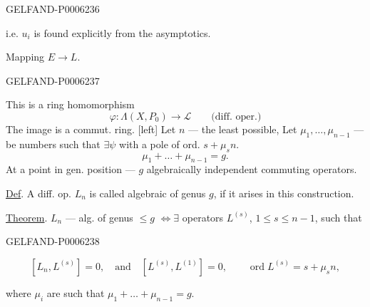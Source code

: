 \begin{GelfandAdjacentEvidence}{GELFAND-P000623}{6}

i.e. \(u_i\) is found explicitly from the asymptotics.

Mapping \(E\longrightarrow L\).
\end{GelfandAdjacentEvidence}
\begin{GelfandAdjacentEvidence}{GELFAND-P000623}{7}

This is a ring homomorphism
\[
\varphi:\Lambda(X,P_0)\longrightarrow\mathcal L\qquad\text{(diff. oper.)}
\]
The image is a commut. ring.
[left] Let \(n\) — the least possible,
Let \(\mu_1,\ldots,\mu_{n-1}\) — be numbers such that
\(\exists\psi\) with a pole of ord. \(s+\mu_s n\).
\[
\mu_1+\ldots+\mu_{n-1}=g.
\]
At a point in gen. position — \(g\) algebraically independent commuting operators.

\underline{Def}. A diff. op. \(L_n\) is called algebraic of genus \(g\), if it arises in this construction.

\underline{Theorem}. \(L_n\) — alg. of genus \(\le g\)
\(\Longleftrightarrow\exists\) operators \(L^{(s)}\), \(1\le s\le n-1\), such that
\end{GelfandAdjacentEvidence}
\begin{GelfandAdjacentEvidence}{GELFAND-P000623}{8}

\[
[L_n,L^{(s)}]=0,\quad\text{and}\quad [L^{(s)},L^{(1)}]=0,\qquad
\operatorname{ord} L^{(s)}=s+\mu_s n,
\]
\end{GelfandAdjacentEvidence}

where \(\mu_i\) are such that \(\mu_1+\ldots+\mu_{n-1}=g\).


